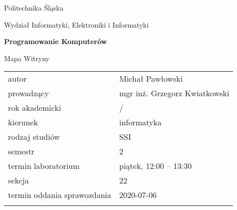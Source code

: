 \documentclass[12pt,a4paper,twoside]{article}
\newcounter{rok}
\newcommand{\rokakademicki}{%
   \setcounter{rok}{\number\year}%
   \ifthenelse{\number\month<10}%
   {\addtocounter{rok}{-1}}%
   {}%
   \arabic{rok}/\addtocounter{rok}{1}\arabic{rok}
}
\begin{document}
\frenchspacing
\thispagestyle{empty}
\begin{center}
{\Large\sf Politechnika Śląska   %

Wydział Informatyki, Elektroniki i Informatyki

}

\vfill

 

\vfill\vfill

{\Huge\sffamily\bfseries Programowanie Komputerów\par}  

\vfill\vfill

{\LARGE\sf Mapa Witryny}   


\vfill \vfill\vfill\vfill






\begin{tabular}{ll}
	\toprule
	autor                       & Michał Pawłowski    \\
	prowadzący                  &  mgr inż. Grzegorz Kwiatkowski   \\
	rok akademicki              & \rokakademicki         \\
	kierunek                    & informatyka            \\
	rodzaj studiów              & SSI                    \\
	semestr                     & 2                      \\
	termin laboratorium         & piątek, 12:00 -- 13:30 \\
	sekcja                      & 22                     \\
	termin oddania sprawozdania & 2020-07-06             \\
	\bottomrule
	                            &
\end{tabular}

\end{center}

\cleardoublepage

\end{document}

